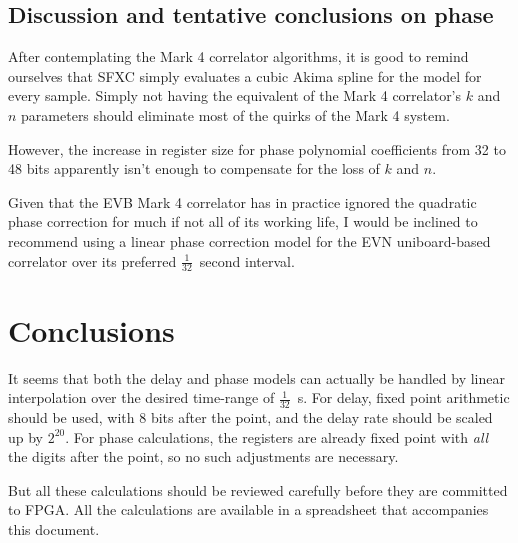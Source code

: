 \documentclass[a4paper]{article}
\begin{document}
\subsection{Discussion and tentative conclusions on phase}
After contemplating the Mark 4 correlator algorithms, it is good to
remind ourselves that SFXC simply evaluates a cubic Akima
spline for the model for every sample.  Simply not having the
equivalent of the Mark 4 correlator's $k$ and $n$ parameters should
eliminate most of the quirks of the Mark 4 system.

However, the increase in register size for phase polynomial coefficients from 32 to 48 bits apparently isn't enough to compensate for the loss of $k$ and $n$.

Given that the EVB Mark 4 correlator has in practice ignored the quadratic phase correction for much if not all of its working life, I would be inclined to recommend using a linear phase correction model for the EVN uniboard-based correlator over its preferred $\frac{1}{32}$~second interval.  

\section{Conclusions}
It seems that both the delay and phase models can actually be handled by linear interpolation over the desired time-range of $\frac{1}{32}$~s.  For delay, fixed point arithmetic should be used, with 8 bits after the point, and the delay rate should be scaled up by $2^{20}$.  For phase calculations, the registers are already fixed point with \emph{all} the digits after the point, so no such adjustments are necessary.

But all these calculations should be reviewed carefully before they are committed to FPGA.  All the calculations are available in a spreadsheet that accompanies this document.
\end{document}
